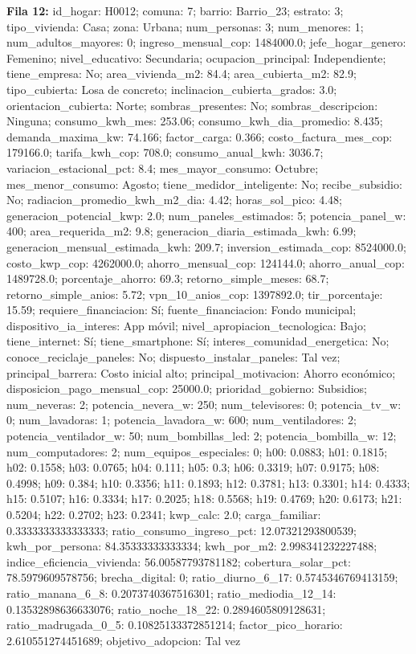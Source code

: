 {\footnotesize\textbf{Fila 12:} id\_hogar: H0012; comuna: 7; barrio: Barrio\_23; estrato: 3; tipo\_vivienda: Casa; zona: Urbana; num\_personas: 3; num\_menores: 1; num\_adultos\_mayores: 0; ingreso\_mensual\_cop: 1484000.0; jefe\_hogar\_genero: Femenino; nivel\_educativo: Secundaria; ocupacion\_principal: Independiente; tiene\_empresa: No; area\_vivienda\_m2: 84.4; area\_cubierta\_m2: 82.9; tipo\_cubierta: Losa de concreto; inclinacion\_cubierta\_grados: 3.0; orientacion\_cubierta: Norte; sombras\_presentes: No; sombras\_descripcion: Ninguna; consumo\_kwh\_mes: 253.06; consumo\_kwh\_dia\_promedio: 8.435; demanda\_maxima\_kw: 74.166; factor\_carga: 0.366; costo\_factura\_mes\_cop: 179166.0; tarifa\_kwh\_cop: 708.0; consumo\_anual\_kwh: 3036.7; variacion\_estacional\_pct: 8.4; mes\_mayor\_consumo: Octubre; mes\_menor\_consumo: Agosto; tiene\_medidor\_inteligente: No; recibe\_subsidio: No; radiacion\_promedio\_kwh\_m2\_dia: 4.42; horas\_sol\_pico: 4.48; generacion\_potencial\_kwp: 2.0; num\_paneles\_estimados: 5; potencia\_panel\_w: 400; area\_requerida\_m2: 9.8; generacion\_diaria\_estimada\_kwh: 6.99; generacion\_mensual\_estimada\_kwh: 209.7; inversion\_estimada\_cop: 8524000.0; costo\_kwp\_cop: 4262000.0; ahorro\_mensual\_cop: 124144.0; ahorro\_anual\_cop: 1489728.0; porcentaje\_ahorro: 69.3; retorno\_simple\_meses: 68.7; retorno\_simple\_anios: 5.72; vpn\_10\_anios\_cop: 1397892.0; tir\_porcentaje: 15.59; requiere\_financiacion: Sí; fuente\_financiacion: Fondo municipal; dispositivo\_ia\_interes: App móvil; nivel\_apropiacion\_tecnologica: Bajo; tiene\_internet: Sí; tiene\_smartphone: Sí; interes\_comunidad\_energetica: No; conoce\_reciclaje\_paneles: No; dispuesto\_instalar\_paneles: Tal vez; principal\_barrera: Costo inicial alto; principal\_motivacion: Ahorro económico; disposicion\_pago\_mensual\_cop: 25000.0; prioridad\_gobierno: Subsidios; num\_neveras: 2; potencia\_nevera\_w: 250; num\_televisores: 0; potencia\_tv\_w: 0; num\_lavadoras: 1; potencia\_lavadora\_w: 600; num\_ventiladores: 2; potencia\_ventilador\_w: 50; num\_bombillas\_led: 2; potencia\_bombilla\_w: 12; num\_computadores: 2; num\_equipos\_especiales: 0; h00: 0.0883; h01: 0.1815; h02: 0.1558; h03: 0.0765; h04: 0.111; h05: 0.3; h06: 0.3319; h07: 0.9175; h08: 0.4998; h09: 0.384; h10: 0.3356; h11: 0.1893; h12: 0.3781; h13: 0.3301; h14: 0.4333; h15: 0.5107; h16: 0.3334; h17: 0.2025; h18: 0.5568; h19: 0.4769; h20: 0.6173; h21: 0.5204; h22: 0.2702; h23: 0.2341; kwp\_calc: 2.0; carga\_familiar: 0.3333333333333333; ratio\_consumo\_ingreso\_pct: 12.07321293800539; kwh\_por\_persona: 84.35333333333334; kwh\_por\_m2: 2.998341232227488; indice\_eficiencia\_vivienda: 56.00587793781182; cobertura\_solar\_pct: 78.5979609578756; brecha\_digital: 0; ratio\_diurno\_6\_17: 0.5745346769413159; ratio\_manana\_6\_8: 0.2073740367516301; ratio\_mediodia\_12\_14: 0.13532898636633076; ratio\_noche\_18\_22: 0.2894605809128631; ratio\_madrugada\_0\_5: 0.10825133372851214; factor\_pico\_horario: 2.610551274451689; objetivo\_adopcion: Tal vez\par}
